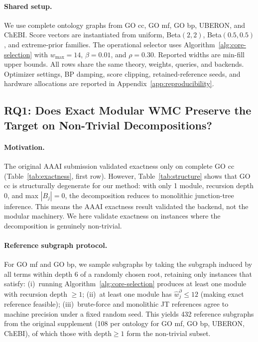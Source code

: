 \documentclass[12pt]{article}
\newcommand{\suppref}[1]{Appendix~\ref{#1}}
\begin{document}
\paragraph{Shared setup.}
We use complete ontology graphs from GO cc, GO mf, GO bp, UBERON, and
ChEBI. Score vectors are instantiated from uniform, Beta$(2,2)$,
Beta$(0.5,0.5)$, and extreme-prior families. The operational selector
uses Algorithm~\ref{alg:core-selection} with $w_{\max}=14$,
$\beta=0.01$, and $\rho=0.30$. Reported widths are min-fill upper
bounds. All rows share the same theory, weights, queries, and backends.
Optimizer settings, BP damping, score clipping, retained-reference
seeds, and hardware allocations are reported in \suppref{app:reproducibility}.

\subsection{RQ1: Does Exact Modular WMC Preserve the Target on Non-Trivial Decompositions?}
\label{sec:rq1}

\paragraph{Motivation.}
The original AAAI submission validated exactness only on complete GO cc
(Table~\ref{tab:exactness}, first row). However, Table~\ref{tab:structure}
shows that GO cc is structurally degenerate for our method: with only 1
module, recursion depth 0, and max $|B_j|=0$, the decomposition reduces
to monolithic junction-tree inference. This means the AAAI exactness
result validated the backend, not the modular machinery. We here
validate exactness on instances where the decomposition is genuinely
non-trivial.

\paragraph{Reference subgraph protocol.}
For GO mf and GO bp, we sample subgraphs by taking the subgraph induced
by all terms within depth 6 of a randomly chosen root, retaining only
instances that satisfy: (i)~running Algorithm~\ref{alg:core-selection}
produces at least one module with recursion depth $\geq 1$; (ii)~at
least one module has $\widehat{w}_j^\partial \leq 12$ (making exact
reference feasible); (iii)~brute-force and monolithic JT references
agree to machine precision under a fixed random seed. This yields
432 reference subgraphs from the original supplement (108 per ontology
for GO mf, GO bp, UBERON, ChEBI), of which those with depth$\geq 1$
form the non-trivial subset.
\end{document}
